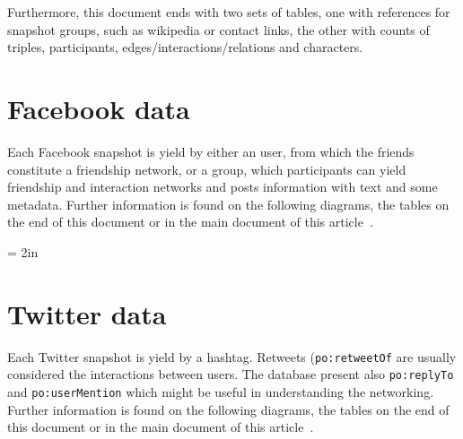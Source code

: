 \documentclass[review]{elsarticle}
\newcommand{\textttt}[1] {\texttt{\footnotesize#1}}
\begin{document}
Furthermore, this document ends with two sets of tables, one with
references for snapshot groups, such as wikipedia or
contact links, 
the other with 
counts of
triples, participants, edges/interactions/relations and characters.


\section{Facebook data}
Each Facebook snapshot is yield by either an user, from which the
friends constitute a friendship network, or a group, which participants
can yield friendship and interaction networks and posts information with
text and some metadata.
Further information is found on the following diagrams, the tables on
the end of this document or in the main document of this
article~\cite{losd}.

% 

\textheight = 2in
\pdfpageheight 5in

\section{Twitter data}
Each Twitter snapshot is yield by a hashtag.
Retweets (\textttt{po:retweetOf} are usually considered the interactions between users.
The database present also \textttt{po:replyTo} and \textttt{po:userMention}
which might be useful in understanding the networking.
Further information is found on the following diagrams, the tables on
the end of this document or in the main document of this
article~\cite{losd}.


\end{document}
